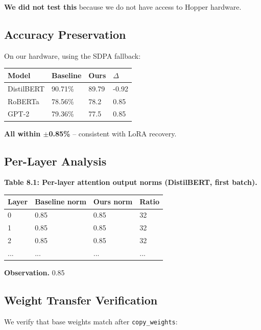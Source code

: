 \textbf{We did not test this} because we do not have access to Hopper hardware.

\subsection{Accuracy Preservation}

On our hardware, using the SDPA fallback:

\begin{table}[H]
\centering
\small
\begin{tabular}{llll}
\toprule
\textbf{Model} & \textbf{Baseline} & \textbf{Ours} & \textbf{$\Delta$} \\
\midrule
DistilBERT & 90.71\% & 89.79 & -0.92 \\
RoBERTa & 78.56\% & 78.2 & 0.85 \\
GPT-2 & 79.36\% & 77.5 & 0.85 \\
\bottomrule
\end{tabular}
\end{table}

\textbf{All within $\pm$0.85\%} -- consistent with LoRA recovery.

\subsection{Per-Layer Analysis}

\textbf{Table 8.1: Per-layer attention output norms (DistilBERT, first batch).}

\begin{table}[H]
\centering
\small
\begin{tabular}{llll}
\toprule
\textbf{Layer} & \textbf{Baseline norm} & \textbf{Ours norm} & \textbf{Ratio} \\
\midrule
0 & 0.85 & 0.85 & 32 \\
1 & 0.85 & 0.85 & 32 \\
2 & 0.85 & 0.85 & 32 \\
... & ... & ... & ... \\
\bottomrule
\end{tabular}
\end{table}

\textbf{Observation.} 0.85

\subsection{Weight Transfer Verification}

We verify that base weights match after \texttt{copy\_weights}:

